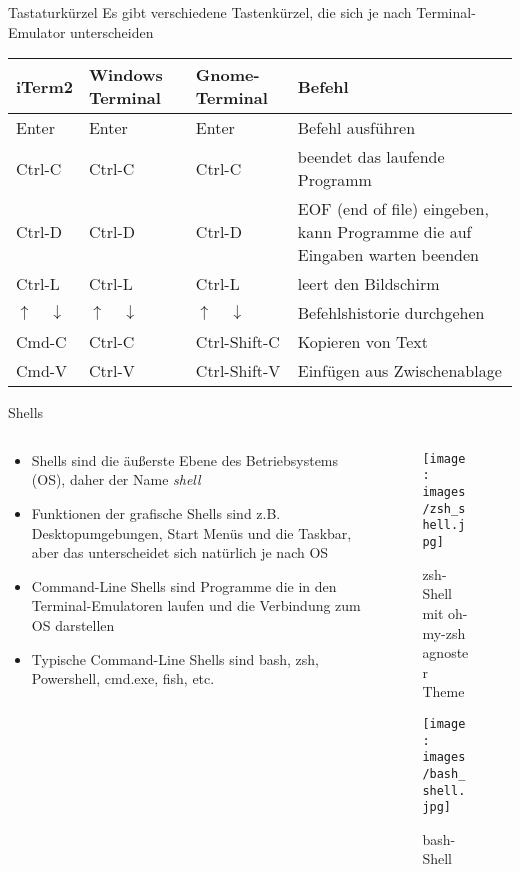 \begin{frame}{Tastaturkürzel}
  Es gibt verschiedene Tastenkürzel, die sich je nach Terminal-Emulator unterscheiden
  \vspace{1em}\\ 
  \begin{tabu}{>{\ttfamily}l | >{\ttfamily}l | >{\ttfamily}l | X[,L]}
    iTerm2 & Windows Terminal & Gnome-Terminal & Befehl \\
    \hline
    Enter & Enter & Enter & Befehl ausführen \\
    Ctrl-C & Ctrl-C & Ctrl-C & beendet das laufende Programm \\
    Ctrl-D & Ctrl-D & Ctrl-D & EOF (end of file) eingeben, kann Programme die auf Eingaben warten beenden \\
    Ctrl-L & Ctrl-L & Ctrl-L & leert den Bildschirm \\
    $\uparrow \quad \downarrow$ & $\uparrow \quad \downarrow$ & $\uparrow \quad \downarrow$ & Befehlshistorie durchgehen\\
    Cmd-C& Ctrl-C & Ctrl-Shift-C & Kopieren von Text \\
    Cmd-V& Ctrl-V & Ctrl-Shift-V & Einfügen aus Zwischenablage \\
  \end{tabu}
\end{frame}

\begin{frame}{Shells}
  \begin{columns}
    \begin{column}{0.5\textwidth}
      \begin{itemize}
        \item Shells sind die äußerste Ebene des Betriebsystems (OS), daher der Name \textit{shell}
        \item Funktionen der grafische Shells sind z.B. Desktopumgebungen, Start Menüs und die Taskbar, aber das unterscheidet sich natürlich je nach OS 
        \item Command-Line Shells sind Programme die in den Terminal-Emulatoren  laufen und die Verbindung zum OS darstellen
        \item Typische Command-Line Shells sind bash, zsh, Powershell, cmd.exe, fish, etc.
      \end{itemize} 
    \end{column}
    \begin{column}{0.5\textwidth}
      \begin{figure}
        \texttt{[image: images/zsh\_shell.jpg]}
      \caption*{zsh-Shell mit oh-my-zsh agnoster Theme}
      \end{figure}
      \begin{figure}
        \texttt{[image: images/bash\_shell.jpg]}
      \caption*{bash-Shell}
      \end{figure}
    \end{column}
  \end{columns}
  
\end{frame}


